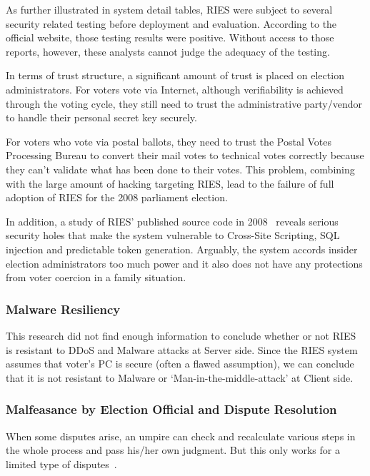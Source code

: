 As further illustrated in system detail tables, RIES were subject to
several security related testing before deployment and
evaluation. According to the official website, those testing results
were positive. Without access to those reports, however, these
analysts cannot judge the adequacy of the testing.

In terms of trust structure, a significant amount of trust is placed
on election administrators. For voters vote via Internet, although
verifiability is achieved through the voting cycle, they still need to
trust the administrative party/vendor to handle their personal secret
key securely.

For voters who vote via postal ballots, they need to trust the Postal
Votes Processing Bureau to convert their mail votes to technical votes
correctly because they can't validate what has been done to their
votes. This problem, combining with the large amount of hacking
targeting RIES, lead to the failure of full adoption of RIES for the
2008 parliament election.

In addition, a study of RIES' published source code in
2008~\cite{gonggrijp2009} reveals serious security holes that make the
system vulnerable to Cross-Site Scripting, SQL injection and
predictable token generation. Arguably, the system accords insider
election administrators too much power and it also does not have any
protections from voter coercion in a family situation.

\subsubsection{Malware Resiliency}

This research did not find enough information to conclude whether or
not RIES is resistant to DDoS and Malware attacks at Server
side. Since the RIES system assumes that voter's PC is secure (often a
flawed assumption), we can conclude that it is not resistant to
Malware or `Man-in-the-middle-attack' at Client side.

\subsubsection{Malfeasance by Election Official and Dispute Resolution}

When some disputes arise, an umpire can check and recalculate various
steps in the whole process and pass his/her own judgment. But this
only works for a limited type of disputes~\cite{hubbers2008}.


